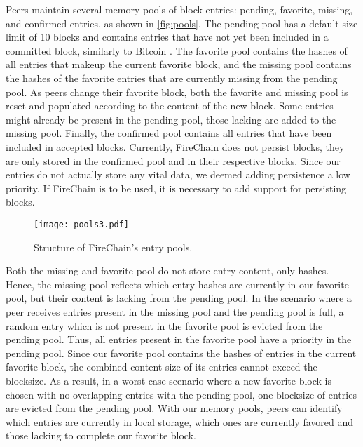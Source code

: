 \documentclass[USenglish]{uit-thesis}
\begin{document}
Peers maintain several memory pools of block entries: pending, favorite, missing, and confirmed entries, as shown in \autoref{fig:pools}.
The pending pool has a default size limit of 10 blocks and contains entries that have not yet been included in a committed block, similarly to Bitcoin \cite{bitcoin}.
The favorite pool contains the hashes of all entries that makeup the current favorite block, and the missing pool contains the hashes of the favorite entries that are currently missing from the pending pool.
As peers change their favorite block, both the favorite and missing pool is reset and populated according to the content of the new block.
Some entries might already be present in the pending pool, those lacking are added to the missing pool.
Finally, the confirmed pool contains all entries that have been included in accepted blocks.
Currently, FireChain does not persist blocks, they are only stored in the confirmed pool and in their respective blocks.
Since our entries do not actually store any vital data, we deemed adding persistence a low priority.  
If FireChain is to be used, it is necessary to add support for persisting blocks. 

\begin{figure}[h]
	\centering
	\texttt{[image: pools3.pdf]}
	\caption[Entry pools]{Structure of FireChain's entry pools. }
	\label{fig:pools}
\end{figure}


Both the missing and favorite pool do not store entry content, only hashes.
Hence, the missing pool reflects which entry hashes are currently in our favorite pool, but their content is lacking from the pending pool.
In the scenario where a peer receives entries present in the missing pool and the pending pool is full, a random entry which is not present in the favorite pool is evicted from the pending pool.
Thus, all entries present in the favorite pool have a priority in the pending pool.
Since our favorite pool contains the hashes of entries in the current favorite block, the combined content size of its entries cannot exceed the blocksize. 
As a result, in a worst case scenario where a new favorite block is chosen with no overlapping entries with the pending pool, one blocksize of entries are evicted from the pending pool.
With our memory pools, peers can identify which entries are currently in local storage, which ones are currently favored and those lacking to complete our favorite block.
\end{document}
